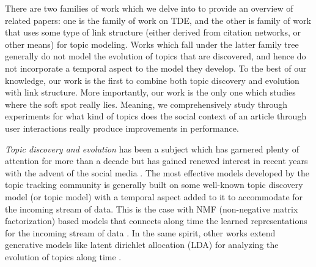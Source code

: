 There are two families of work which we delve into to provide an overview of
related papers: one is the family of work on TDE, and the other is
family of work that uses some type of link structure (either derived from citation networks,
or other means) for topic modeling.  Works which fall under the latter
family tree generally do not model the evolution of topics that are discovered, and hence do not
incorporate a temporal aspect to the model they develop.  To the best of our knowledge, 
our work is the first to combine both topic discovery and evolution with link structure.
More importantly, our work is the only one which studies where the soft spot really lies.
Meaning, we comprehensively study through experiments for what kind of topics does
the social context of an article through user interactions really produce improvements in performance.

\emph{Topic discovery and evolution} has been a subject which has garnered plenty of attention for more than a decade 
but has gained renewed interest in recent 
years with the advent of the social media \cite{Sayyadi:2009,Becker:2009}.   
The most effective models developed by the topic tracking community is generally built on
some well-known topic discovery model (or topic model) with a temporal aspect added to it to accommodate for the incoming
stream of data.  This is the case with NMF (non-negative matrix factorization) \cite{Lee:Nature}
based models that connects along time the learned representations for the incoming stream of
data \cite{Blei:2006, mairal2010, Saha:2012, Vaca:2014}. In the same spirit, other works extend 
generative models like latent dirichlet allocation (LDA) \cite{blei2003}
for analyzing the evolution of topics along time \cite{AlSumait:2008, Wang:2012, Kawamae:2011, Wang:2006}. 

